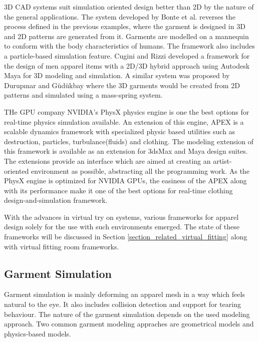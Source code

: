  3D CAD systems suit simulation oriented design better than 2D by the nature of the general applications. The system developed by Bonte et al.\cite{Bonte2002} reverses the process
 defined in the previous examples, where the garment is designed in 3D and 2D patterns are generated from it. Garments are modelled on a mannequin to conform with the body characteristics
 of humans. The framework also includes a particle-based simulation feature. Cugini and Rizzi  developed a framework\cite{Cugini2002} for the design of men apparel items with a 2D/3D 
 hybrid approach using Autodesk Maya\cite{Autodesk2013} for 3D modeling and simulation. A similar system was proposed by Durup{\i}nar and G{\"u}d{\"u}kbay\cite{Durupinar2007} where the 3D garments
 would be created from 2D patterns and simulated using a mass-spring system.
 
 THe GPU company NVIDIA's PhysX physics engine is one the best options for real-time physics simulation available\cite{WikiPhysx2012}. An extension of this engine, APEX is a scalable 
 dynamics framework with specialized physic based utilities such as destruction, particles, turbulance(fluids) and clothing\cite{Nvidia2013}. The modeling extension of this framework
 is available as an extension for 3dsMax\cite{Autodesk3DS2013} and Maya\cite{Autodesk2013} design suites. The extensions provide an interface which are aimed at creating an artist-oriented environment as 
 possible, abstracting all the programming work. As the PhysX engine is optimized for NVIDIA GPUs, the easiness of the APEX along with its performance make it one of the 
 best options for real-time clothing design-and-simulation framework.  
 
 With the advances in virtual try on systems, various frameworks for apparel design solely for the use with such environments emerged. The state of these frameworks will be discussed 
 in Section \ref{section_related_virtual_fitting} along with virtual fitting room frameworks.  
   
\subsection{Garment Simulation}
Garment simulation is mainly deforming an apparel mesh in a way which feels natural to the eye. It also includes collision detection and support for tearing behaviour. The nature of the garment simulation depends on the used modeling approach. 
Two common garment modeling appraches are geometrical models\cite{Weil1986} and physics-based models. 

